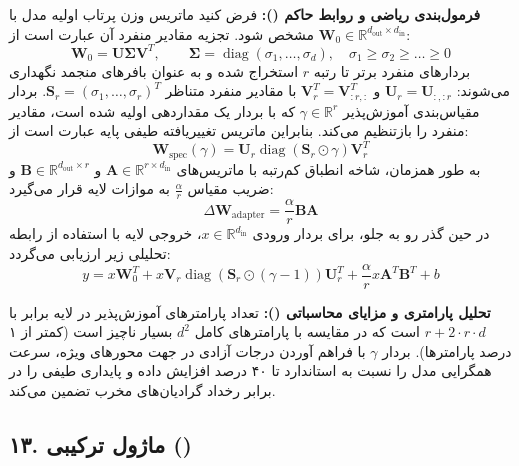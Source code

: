\textbf{فرمول‌بندی ریاضی و روابط حاکم ():}
فرض کنید ماتریس وزن پرتاب اولیه مدل با $\mathbf{W}_0 \in \mathbb{R}^{d_{\text{out}} \times d_{\text{in}}}$ مشخص شود. تجزیه مقادیر منفرد آن عبارت است از:
\begin{equation}
\mathbf{W}_0 = \mathbf{U} \mathbf{\Sigma} \mathbf{V}^T, \qquad \mathbf{\Sigma} = \operatorname{diag}(\sigma_1, \dots, \sigma_d), \quad \sigma_1 \ge \sigma_2 \ge \dots \ge 0
\end{equation}
بردارهای منفرد برتر تا رتبه $r$ استخراج شده و به عنوان بافرهای منجمد نگهداری می‌شوند: $\mathbf{U}_r = \mathbf{U}_{:, :r}$ و $\mathbf{V}_r^T = \mathbf{V}_{:r, :}^T$ با مقادیر منفرد متناظر $\mathbf{S}_r = (\sigma_1, \dots, \sigma_r)^T$.
بردار مقیاس‌بندی آموزش‌پذیر $\gamma \in \mathbb{R}^r$ که با بردار یک مقداردهی اولیه شده است، مقادیر منفرد را بازتنظیم می‌کند. بنابراین ماتریس تغییریافته طیفی پایه عبارت است از:
\begin{equation}
\mathbf{W}_{\text{spec}}(\gamma) = \mathbf{U}_r \operatorname{diag}(\mathbf{S}_r \odot \gamma) \mathbf{V}_r^T
\end{equation}
به طور همزمان، شاخه انطباق کم‌رتبه با ماتریس‌های $\mathbf{A} \in \mathbb{R}^{r \times d_{\text{in}}}$ و $\mathbf{B} \in \mathbb{R}^{d_{\text{out}} \times r}$ و ضریب مقیاس $\frac{\alpha}{r}$ به موازات لایه قرار می‌گیرد:
\begin{equation}
\Delta \mathbf{W}_{\text{adapter}} = \frac{\alpha}{r} \mathbf{B} \mathbf{A}
\end{equation}
در حین گذر رو به جلو، برای بردار ورودی $x \in \mathbb{R}^{d_{\text{in}}}$، خروجی لایه با استفاده از رابطه تحلیلی زیر ارزیابی می‌گردد:
\begin{equation}
y = x \mathbf{W}_0^T + x \mathbf{V}_r \operatorname{diag}\left(\mathbf{S}_r \odot (\gamma - 1)\right) \mathbf{U}_r^T + \frac{\alpha}{r} x \mathbf{A}^T \mathbf{B}^T + b
\end{equation}

\textbf{تحلیل پارامتری و مزایای محاسباتی ():}
تعداد پارامترهای آموزش‌پذیر در لایه  برابر با $r + 2 \cdot r \cdot d$ است که در مقایسه با پارامترهای کامل $d^2$ بسیار ناچیز است (کمتر از ۱ درصد پارامترها). بردار $\gamma$ با فراهم آوردن درجات آزادی در جهت محورهای ویژه، سرعت همگرایی مدل را نسبت به  استاندارد تا ۴۰ درصد افزایش داده و پایداری طیفی را در برابر رخداد گرادیان‌های مخرب تضمین می‌کند.



\subsection*{۱۳. ماژول ترکیبی  ()}

